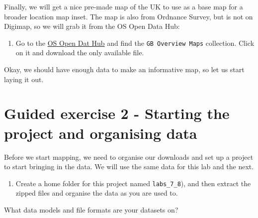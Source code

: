 \documentclass[
  letterpaper,
  DIV=11,
  numbers=noendperiod]{scrreprt}
\providecommand{\tightlist}{%
  \setlength{\itemsep}{0pt}\setlength{\parskip}{0pt}}\usepackage{longtable,booktabs,array}
\begin{document}
Finally, we will get a nice pre-made map of the UK to use as a base map
for a broader location map inset. The map is also from Ordnance Survey,
but is not on Digimap, so we will grab it from the OS Open Data Hub:

\begin{enumerate}
\def\labelenumi{(\arabic{enumi})}
\setcounter{enumi}{191}
\tightlist
\item
  Go to the \href{https://osdatahub.os.uk/downloads/open}{OS Open Dat
  Hub} and find the \texttt{GB\ Overview\ Maps} collection. Click on it
  and download the only available file.
\end{enumerate}

Okay, we should have enough data to make an informative map, so let us
start laying it out.

\section{Guided exercise 2 - Starting the project and organising
data}\label{guided-exercise-2---starting-the-project-and-organising-data}

Before we start mapping, we need to organise our downloads and set up a
project to start bringing in the data. We will use the same data for
this lab and the next.

\begin{enumerate}
\def\labelenumi{(\arabic{enumi})}
\setcounter{enumi}{192}
\tightlist
\item
  Create a home folder for this project named \texttt{labs\_7\_8}), and
  then extract the zipped files and organise the data as you are used
  to.
\end{enumerate}

\begin{tcolorbox}[enhanced jigsaw, coltitle=black, toprule=.15mm, breakable, opacitybacktitle=0.6, left=2mm, colback=white, leftrule=.75mm, rightrule=.15mm, colbacktitle=quarto-callout-important-color!10!white, toptitle=1mm, titlerule=0mm, colframe=quarto-callout-important-color-frame, arc=.35mm, bottomtitle=1mm, opacityback=0, bottomrule=.15mm, title=\textcolor{quarto-callout-important-color}{\faExclamation}\hspace{0.5em}{Stop and Think}]

What data models and file formats are your datasets on?

\end{tcolorbox}
\end{document}
